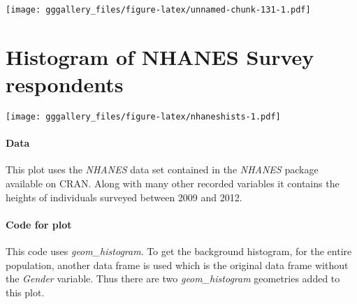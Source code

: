 \documentclass[]{book}
\begin{document}
\texttt{[image: gggallery\_files/figure-latex/unnamed-chunk-131-1.pdf]}

\hypertarget{nhanes}{%
\chapter*{Histogram of NHANES Survey respondents}\label{nhanes}}

\texttt{[image: gggallery\_files/figure-latex/nhaneshists-1.pdf]}

\hypertarget{nhanesdata}{%
\subsubsection*{Data}\label{nhanesdata}}

This plot uses the \emph{NHANES} data set contained in the \emph{NHANES} package available on CRAN. Along with many other recorded variables it contains the heights of individuals surveyed between 2009 and 2012.

\hypertarget{nhanescode}{%
\subsubsection*{Code for plot}\label{nhanescode}}

This code uses \emph{geom\_histogram}. To get the background histogram, for the entire population,
another data frame is used which is the original data frame without the \emph{Gender} variable.
Thus there are two \emph{geom\_histogram} geometries added to this plot.
\end{document}
